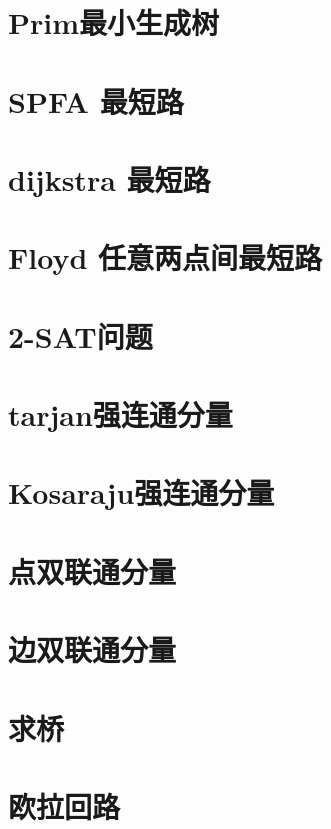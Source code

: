 \section{Prim最小生成树}
\raggedbottom
\hrulefill
\section{SPFA 最短路}
\raggedbottom
\hrulefill
\section{dijkstra 最短路}
\raggedbottom
\hrulefill
\section{Floyd 任意两点间最短路}
\raggedbottom
\hrulefill
\section{2-SAT问题}
\raggedbottom
\hrulefill
\section{tarjan强连通分量}
\raggedbottom
\hrulefill
\section{Kosaraju强连通分量}
\raggedbottom
\hrulefill
\section{点双联通分量}
\raggedbottom
\hrulefill
\section{边双联通分量}
\raggedbottom
\hrulefill
\section{求桥}
\raggedbottom
\hrulefill
\section{欧拉回路}
\raggedbottom
\hrulefill
